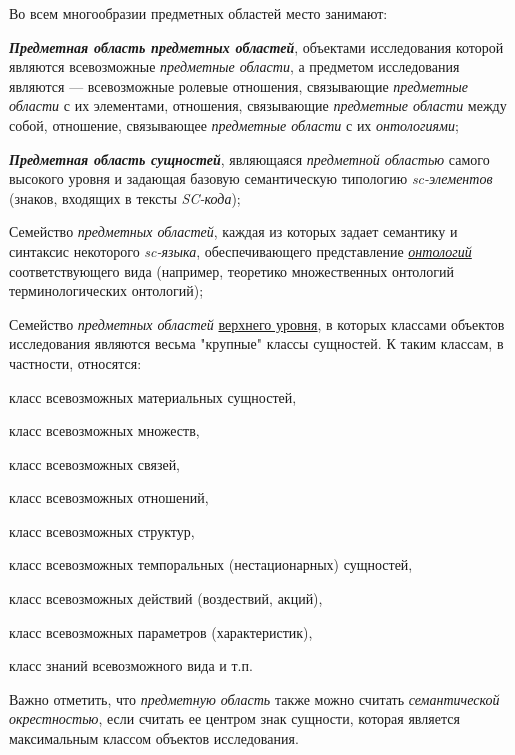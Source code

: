 \bigskip
Во всем многообразии предметных областей  место занимают:
\begin{textitemize}
	\item \textbf{\textit{Предметная область предметных областей}}, объектами исследования которой являются всевозможные \textit{предметные области}, а предметом исследования являются --- всевозможные ролевые отношения, связывающие \textit{предметные области} с их элементами, отношения, связывающие \textit{предметные области} между собой, отношение, связывающее \textit{предметные области} с их \textit{онтологиями};	
	\item \textbf{\textit{Предметная область сущностей}}, являющаяся \textit{предметной областью} самого высокого уровня и задающая базовую семантическую типологию \textit{sc-элементов} (знаков, входящих в тексты \textit{SC-кода});	
	\item Семейство \textit{предметных областей}, каждая из которых задает семантику и синтаксис некоторого \textit{sc-языка}, обеспечивающего представление \textit{\uline{онтологий}} соответствующего вида (например, теоретико множественных онтологий терминологических онтологий);	
	\item Семейство \textit{предметных областей} \uline{верхнего уровня}, в которых классами объектов исследования являются весьма "крупные"{} классы сущностей. К таким классам, в частности, относятся:	
	\begin{textitemize}	
		\item класс всевозможных материальных сущностей,	
		\item класс всевозможных множеств,	
		\item класс всевозможных связей,	
		\item класс всевозможных отношений,	
		\item класс всевозможных структур,	
		\item класс всевозможных темпоральных (нестационарных) сущностей,	
		\item класс всевозможных действий (воздествий, акций),	
		\item класс всевозможных параметров (характеристик),
		\item класс знаний всевозможного вида и т.п.	
	\end{textitemize}
\end{textitemize}

Важно отметить, что \textit{предметную область} также можно считать \textit{семантической окрестностью}, если считать ее центром знак сущности, которая является максимальным классом объектов исследования.

